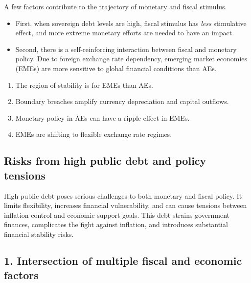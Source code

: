 A few factors contribute to the trajectory of monetary and fiscal stimulus.

\begin{itemize}
\item First, when sovereign debt levels are high, fiscal stimulus has \emph{less} stimulative
effect, and more extreme monetary efforts are needed to have an impact.
\item Second, there is a self-reinforcing interaction between fiscal and monetary policy. Due
to foreign exchange rate dependency, emerging market economies (EMEs) are more sensitive to
global financial conditions than AEs.
\end{itemize}

\begin{cikeybox}[title={Implications of this foreign exchange rate dependency}]
\begin{enumerate}
\item The region of stability is  for EMEs than AEs.
\item Boundary breaches amplify currency depreciation and capital outflows.
\item Monetary policy in AEs can have a ripple effect in EMEs.
\item EMEs are shifting to flexible exchange rate regimes.
\end{enumerate}
\end{cikeybox}


\subsection*{Risks from high public debt and policy tensions}

High public debt poses serious challenges to both monetary and fiscal policy. It limits
flexibility, increases financial vulnerability, and can cause tensions between inflation
control and economic support goals. This debt strains government finances, complicates the
fight against inflation, and introduces substantial financial stability risks.

\subsection*{1. Intersection of multiple fiscal and economic factors}

